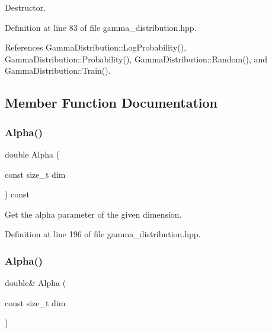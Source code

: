 Destructor. 



Definition at line 83 of file gamma\+\_\+distribution.\+hpp.



References Gamma\+Distribution\+::\+Log\+Probability(), Gamma\+Distribution\+::\+Probability(), Gamma\+Distribution\+::\+Random(), and Gamma\+Distribution\+::\+Train().



\subsection{Member Function Documentation}
\mbox{\label{classmlpack_1_1distribution_1_1GammaDistribution_ab0770061da842c3d1ef78b6c13d6b324}} 
\subsubsection{Alpha()\hspace{0.1cm}{\footnotesize\ttfamily [1/2]}}
{\footnotesize\ttfamily double Alpha (\begin{DoxyParamCaption}\item[{const size\+\_\+t}]{dim }\end{DoxyParamCaption}) const\hspace{0.3cm}{\ttfamily [inline]}}



Get the alpha parameter of the given dimension. 



Definition at line 196 of file gamma\+\_\+distribution.\+hpp.

\mbox{\label{classmlpack_1_1distribution_1_1GammaDistribution_af677766dff71e1394fb7531aa73ec755}} 
\subsubsection{Alpha()\hspace{0.1cm}{\footnotesize\ttfamily [2/2]}}
{\footnotesize\ttfamily double\& Alpha (\begin{DoxyParamCaption}\item[{const size\+\_\+t}]{dim }\end{DoxyParamCaption})\hspace{0.3cm}{\ttfamily [inline]}}



